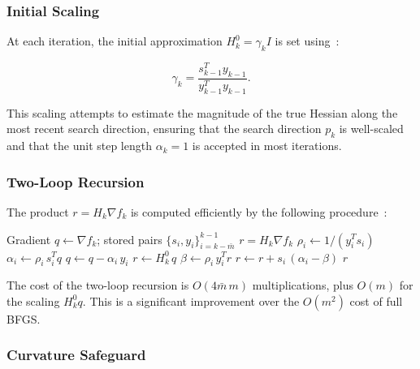 \documentclass[11pt,a4paper]{article}
\begin{document}
\subsubsection{Initial Scaling}

At each iteration, the initial approximation $H_k^0 = \gamma_k I$ is set 
using~\cite[Eq.~9.6]{nocedal2006numerical}:

\begin{equation}
\label{eq:gamma}
    \gamma_k = \frac{s_{k-1}^T y_{k-1}}{y_{k-1}^T y_{k-1}}.
\end{equation}

This scaling attempts to estimate the magnitude of the true Hessian along the most 
recent search direction, ensuring that the search direction $p_k$ is well-scaled 
and that the unit step length $\alpha_k = 1$ is accepted in most iterations.


\subsubsection{Two-Loop Recursion}

The product $r = H_k \nabla f_k$ is computed efficiently by the following 
procedure~\cite[Algorithm~9.1]{nocedal2006numerical}:

\begin{algorithm}[H]
\caption{L-BFGS Two-Loop Recursion~\cite[Algorithm~9.1]{nocedal2006numerical}}
\label{alg:twoloop}
\begin{algorithmic}[1]
    \Require Gradient $q \gets \nabla f_k$; stored pairs $\{s_i, y_i\}_{i=k-\bar{m}}^{k-1}$
    \Ensure $r = H_k \nabla f_k$
        \State $\rho_i \gets 1 / (y_i^T s_i)$
        \State $\alpha_i \gets \rho_i\, s_i^T q$
        \State $q \gets q - \alpha_i\, y_i$
    \EndFor
    \State $r \gets H_k^0\, q$ 
        \State $\beta \gets \rho_i\, y_i^T r$
        \State $r \gets r + s_i\,(\alpha_i - \beta)$
    \EndFor
    \State \Return $r$
\end{algorithmic}
\end{algorithm}

The cost of the two-loop recursion is $O(4\bar{m}\,m)$ multiplications, plus $O(m)$ for 
the scaling $H_k^0 q$. This is a significant improvement over the $O(m^2)$ cost of 
full BFGS.


\subsubsection{Curvature Safeguard}
\end{document}
